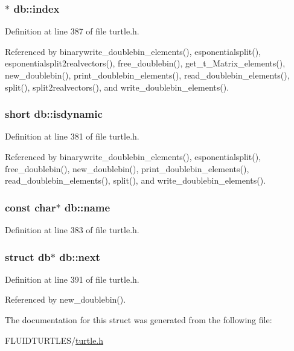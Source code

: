 \hypertarget{structdb_aadf749a679e24e7866bee9f005e2d271}{
\subsubsection[{index}]{$\ast$ db\-::index}}\label{structdb_aadf749a679e24e7866bee9f005e2d271}


Definition at line 387 of file turtle.\-h.



Referenced by binarywrite\-\_\-doublebin\-\_\-elements(), esponentialsplit(), esponentialsplit2realvectors(), free\-\_\-doublebin(), get\-\_\-t\-\_\-\-Matrix\-\_\-elements(), new\-\_\-doublebin(), print\-\_\-doublebin\-\_\-elements(), read\-\_\-doublebin\-\_\-elements(), split(), split2realvectors(), and write\-\_\-doublebin\-\_\-elements().

\hypertarget{structdb_abf7abcb6a3842253e33d03a3bfbcd635}{
\subsubsection[{isdynamic}]{\setlength{\rightskip}{0pt plus 5cm}short db\-::isdynamic}}\label{structdb_abf7abcb6a3842253e33d03a3bfbcd635}


Definition at line 381 of file turtle.\-h.



Referenced by binarywrite\-\_\-doublebin\-\_\-elements(), esponentialsplit(), free\-\_\-doublebin(), new\-\_\-doublebin(), print\-\_\-doublebin\-\_\-elements(), read\-\_\-doublebin\-\_\-elements(), split(), and write\-\_\-doublebin\-\_\-elements().

\hypertarget{structdb_aa7ec388f1a607d03270c4d3b6488f7ce}{
\subsubsection[{name}]{\setlength{\rightskip}{0pt plus 5cm}const char$\ast$ db\-::name}}\label{structdb_aa7ec388f1a607d03270c4d3b6488f7ce}


Definition at line 383 of file turtle.\-h.

\hypertarget{structdb_a7de19f5692d764d9f9ce76de4ef1de45}{
\subsubsection[{next}]{\setlength{\rightskip}{0pt plus 5cm}struct {\bf db}$\ast$ db\-::next}}\label{structdb_a7de19f5692d764d9f9ce76de4ef1de45}


Definition at line 391 of file turtle.\-h.



Referenced by new\-\_\-doublebin().



The documentation for this struct was generated from the following file\-:\begin{DoxyCompactItemize}
\item 
F\-L\-U\-I\-D\-T\-U\-R\-T\-L\-E\-S/\hyperlink{turtle_8h}{turtle.\-h}\end{DoxyCompactItemize}
